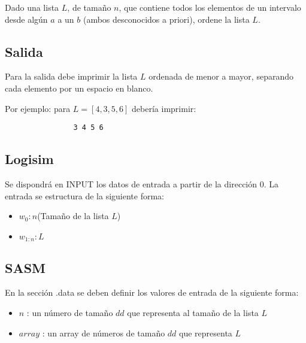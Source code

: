 \documentclass[a4paper]{article}
\begin{document}
\begin{flushleft}
      		Dado una lista $L$, de tamaño $n$, que contiene todos los elementos de un intervalo desde algún $a$ a un $b$ (ambos desconocidos a priori), ordene la lista $L$.
      		 
      		 \subsection*{Salida}
      		 
      		 Para la salida debe imprimir la lista $L$ ordenada de menor a mayor, separando cada elemento por un espacio en blanco.\newline
      		 
      		 Por ejemplo: para $L = [4, 3, 5, 6]$ debería imprimir:
      		 
      		 \begin{lstlisting}
      		 	3 4 5 6
      		 \end{lstlisting}
      		 
      		 	\subsection*{Logisim}
      		 
      		 Se dispondrá en INPUT los datos de entrada a partir de la dirección 0. La entrada se estructura de la siguiente forma:
      		 
      		 \begin{itemize}
      		 	
      		 	\item $w_{0}: n $(Tamaño de la lista $L$)
      		 	\item $w_{1:n} : L$
      		 \end{itemize}
      		 
      		 	\subsection*{SASM}
      		 
      		 En la sección .data se deben definir los valores de entrada de la siguiente forma:
      		 
      		 \begin{itemize}
      		 	
      		 	\item $n$ : un número de tamaño $dd$ que representa al tamaño de la lista $L$
      		 	
      		 	\item $array$ : un array de números de tamaño $dd$ que representa $L$
      		 	

\end{itemize}
\end{flushleft}
\end{document}
